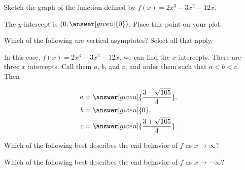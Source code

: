 \documentclass[wordchoicegiven]{ximera}
\begin{document}
\begin{example}
Sketch the graph of the function defined by $f(x)=2x^3-3x^2-12x$.

The $y$-intercept is $(0,\answer[given]{0})$. Place this point on your plot.
\begin{image}
\end{image}



Which of the following are vertical asymptotes?  Select all that apply.

\begin{selectAll}
\end{selectAll}

In this case, $f(x) =2x^3-3x^2-12x$, we can find the
$x$-intercepts.   There are three $x$ intercepts.  Call them $a$, $b$, and $c$, and order them such that $a<b<c$.  Then

\begin{align*}
  a &= \answer[given]{\frac{3-\sqrt{105}}{4}},\\
  b &= \answer[given]{0}, \\
  c &= \answer[given]{\frac{3+\sqrt{105}}{4}}.
\end{align*}


	
  Which of the following best describes the end behavior of $f$ as $x \to \infty$?		
  \begin{multipleChoice}
  \end{multipleChoice}
  Which of the following best describes the end behavior of $f$ as $x \to -\infty$?		
  \begin{multipleChoice}
  \end{multipleChoice}


\end{example}
\end{document}
